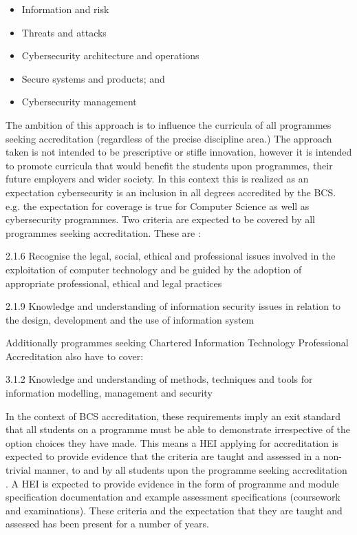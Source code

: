\documentclass[conference]{IEEEtran}
\begin{document}
\begin{itemize}
    \item Information and risk 
    \item Threats and attacks 
    \item Cybersecurity architecture and operations
    \item Secure systems and products; and 
    \item Cybersecurity management
\end{itemize}

The ambition of this approach is to influence the curricula of all programmes seeking accreditation (regardless of the precise discipline area.)  The approach taken is not intended to be prescriptive or stifle innovation, however it is intended to promote curricula that would benefit the students upon programmes, their future employers and wider society.  In this context this is realized as an expectation cybersecurity is an inclusion in all degrees accredited by the BCS. e.g. the expectation for coverage is true for Computer Science as well as cybersecurity programmes. Two criteria are expected to be covered by all programmes seeking accreditation. These are \cite{BCS2018a}:

2.1.6 Recognise the legal, social, ethical and professional issues involved in the exploitation of computer technology and be guided by the adoption of appropriate professional, ethical and legal practices

2.1.9 Knowledge and understanding of information security issues in relation to the design, development and the use of information system

Additionally programmes seeking Chartered Information Technology Professional Accreditation also have to cover:

3.1.2 Knowledge and understanding of methods, techniques and tools for information modelling, management and security

In the context of BCS accreditation, these requirements imply an exit standard that all students on a programme must be able to demonstrate irrespective of the option choices they have made. This means a HEI applying for accreditation is expected to provide evidence that the criteria are taught and assessed in a non-trivial manner, to and by all students upon the programme seeking accreditation . A HEI is expected to provide evidence in the form of programme and module specification documentation and example assessment specifications (coursework and examinations). These criteria and the expectation that they are taught and assessed has been present for a number of years.
\end{document}
